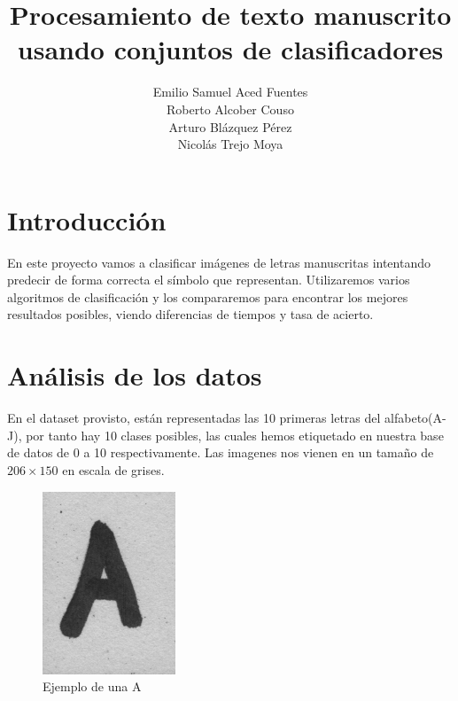 \documentclass[8pt,a4paper]{{esannV2}}
\begin{document}
\title{Procesamiento de texto manuscrito usando conjuntos de clasificadores}

\author{
Emilio Samuel Aced Fuentes \\
Roberto Alcober Couso \\
Arturo Bl\'azquez P\'erez \\
Nicol\'as Trejo Moya \\
}

\maketitle

\section{Introducci\'on}
En este proyecto vamos a clasificar im\'agenes de letras manuscritas intentando predecir de forma correcta el s\'imbolo que representan.
Utilizaremos varios algoritmos de clasificaci\'on y los compararemos para encontrar los mejores resultados posibles, viendo diferencias de tiempos y  tasa de acierto.


\section{An\'alisis de los datos}
En el dataset provisto, est\'an representadas las 10 primeras letras del alfabeto(A-J), por tanto hay 10 clases posibles, las cuales hemos etiquetado en nuestra base de datos de 0 a 10 respectivamente.
Las imagenes nos vienen en un tamaño de $206\times150$ en escala de grises.


\begin{figure}[htbp]
	\centering
    \includegraphics[scale=0.5]{./sin_procesar/l00000_A.png}
    \caption{Ejemplo de una A}
\end{figure}
\end{document}
